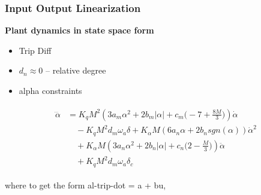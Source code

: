 \documentclass[table,10pt,red]{beamer}	%
\begin{document}
\begin{frame}
	\frametitle{Input Output Linearization}
	\textbf{Plant dynamics in state space form} 
	\begin{itemize}
		\item Trip Diff
		\item $d_n \approx 0$ -- relative degree
		\item alpha constraints
	\end{itemize}
	
\begin{eqnarray*}
\begin{aligned}
	\dddot{\alpha}&=K_q M^2(3a_m\alpha^2+2b_m|\alpha|+c_m\Big(-7+\frac{8M}{3}\Big))\dot{\alpha}\\ 
	&\quad - K_q M^2d_m\omega_a\delta+K_{\alpha}M(6a_n\alpha+2b_n sgn(\alpha))\dot{\alpha}^2\\ 
	&\quad + K_\alpha M(3a_n\alpha^2+2b_n|\alpha|+c_n\Big(2-\frac{M}{3}\Big))\ddot{\alpha}\\ 
	&\quad + K_q M^2d_m\omega_a\delta_c \label{a3dot}
\end{aligned}
\label{eq4}
\end{eqnarray*}

where to get the form al-trip-dot = a + bu, 
\end{frame}
\end{document}

